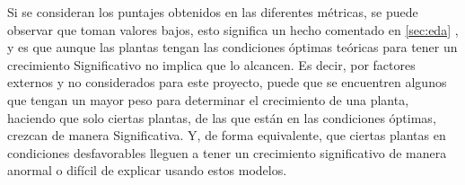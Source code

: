 \documentclass[12pt,a4paper]{article}
\begin{document}
{        Si se consideran los puntajes obtenidos en las diferentes métricas, se puede observar 
        que toman valores bajos, esto significa un hecho comentado en \ref{sec:eda} , 
        y es que aunque las plantas tengan las condiciones óptimas teóricas para tener un 
        crecimiento Significativo no implica que lo alcancen. Es decir, por factores externos 
        y no considerados para este proyecto, puede que se encuentren algunos que tengan un 
        mayor peso para determinar el crecimiento de una planta, haciendo que solo ciertas 
        plantas, de las que están en las condiciones óptimas, crezcan de manera Significativa. Y, 
        de forma equivalente, que ciertas plantas en condiciones desfavorables lleguen a tener 
        un crecimiento significativo de manera anormal o difícil de explicar usando estos 
        modelos. 
    }
    \newpage
\end{document}
